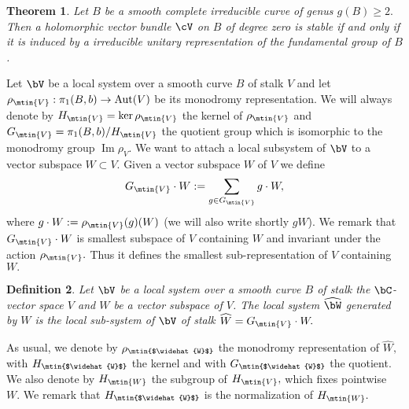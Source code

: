 \documentclass[a4paper,11pt]{amsart}
\newtheorem{theorem}{Theorem}[section]
\newtheorem{definition}[theorem]{Definition}
\DeclareMathOperator{\Aut}{Aut}
\DeclareMathOperator{\Ima}{Im}
\begin{document}
{			\begin{theorem}\label{Thm-UnitaryFlatBundlesNS} Let $B$ be a smooth complete irreducible curve of genus $g(B)\geq 2.$ Then a holomorphic vector bundle $\cV$ on $B$ of degree zero is stable if and only if it is induced by a irreducible unitary representation of the fundamental group of $B$.
				\end{theorem}
			Let $\bV$ be a local system over a smooth curve $B$ of  stalk $V$  and let $\rho_{\mtin{V}}: \pi_1(B,b)\to \Aut(V)$ be its monodromy representation. We will always denote by $H_{\mtin{V}}=\ker \rho_{\mtin{V}}$  the kernel of $\rho_{\mtin{V}}$  and $G_{\mtin{V}}=\pi_1(B,b)/H_{\mtin{V}}$ the quotient group which is isomorphic to the monodromy group $\Ima \rho_V.$ 
			 We want to attach a local subsystem of $\bV$ to a vector subspace $W\subset V.$ Given a vector subspace $W$ of $V$ we define $$G_{\mtin{V}}\cdot W:=\sum_{g\in G_{\mtin{V}}} g\cdot W,$$ where $g\cdot W:=\rho_{\mtin{V}}(g)(W)$ (we will also write shortly $gW$). We remark that $G_{\mtin{V}}\cdot W$ is smallest subspace of $V$ containing $W$ and invariant under the action $\rho_{\mtin{V}}.$
			Thus it defines the smallest sub-representation of $V$ containing $W.$
			 
		
			\begin{definition}\label{Def-GenLS} Let $\bV$ be a local system over a smooth curve $B$ of stalk the $\bC$-vector space $V$ and  $W$ be a vector subspace of $V$. The local system $\widehat{\bW}$ {\em generated by $W$} is the local sub-system of $\bV$ of stalk $\widehat{W}=G_{\mtin{V}}\cdot W.$ 
				\end{definition}
				As usual, we denote by $\rho_{\mtin{$\widehat{W}$}}$ the monodromy representation of $\widehat{W},$ with $H_{\mtin{$\widehat{W}$}}$ the kernel and with $G_{\mtin{$\widehat{W}$}}$ the quotient. We also denote by $H_{\mtin{W}}$ the subgroup of $H_{\mtin{V}},$ which fixes pointwise $W.$ We remark that $H_{\mtin{$\widehat{W}$}}$ is the normalization of $H_{\mtin{W}}.$
				
}
\end{document}
